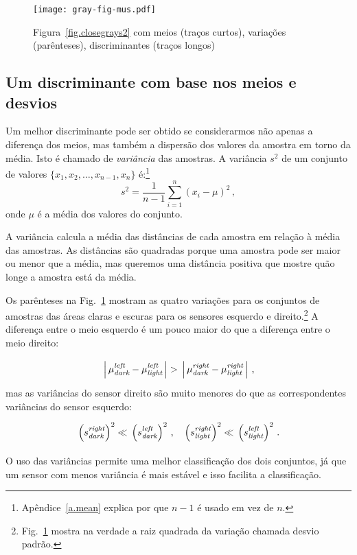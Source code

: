 \begin{figure}
\begin{center}
\texttt{[image: gray-fig-mus.pdf]}
\end{center}
\caption{Figura~\ref{fig.closegrays2} com meios (traços curtos), variações (parênteses), discriminantes (traços longos)}\label{fig.closegraysmus}
\end{figure}

\subsection{Um discriminante com base nos meios e desvios}

Um melhor discriminante pode ser obtido se considerarmos não apenas a diferença dos meios, mas também a dispersão dos valores da amostra em torno da média. Isto é chamado de \emph{variância} das amostras. A variância $s^2$ de um conjunto de valores $\{x_1,x_2,\ldots,x_{n-1},x_n\}$ é:\footnote{Apêndice~\ref{a.mean} explica por que $n-1$ é usado em vez de $n$.}
\[
s^2 = \frac{1}{n-1} \sum_{i=1}^n (x_i-\mu)^2\,,
\]
onde $\mu$ é a média dos valores do conjunto.

A variância calcula a média das distâncias de cada amostra em relação à média das amostras. As distâncias são quadradas porque uma amostra pode ser maior ou menor que a média, mas queremos uma distância positiva que mostre quão longe a amostra está da média.

Os parênteses na Fig.~\ref{fig.closegraysmus} mostram as quatro variações para os conjuntos de amostras das áreas claras e escuras para os sensores esquerdo e direito.\footnote{Fig.~\ref{fig.closegraysmus} mostra na verdade a raiz quadrada da variação chamada desvio padrão.} A diferença entre o meio esquerdo é um pouco maior do que a diferença entre o meio direito:
\[
\rule[-2ex]{0pt}{6ex}\left|\,\mu_{\sub{dark}}^{\sub{left}}-\mu_{\sub{light}}^{\sub{left}}\,\right| > \rule[-2ex]{0pt}{6ex}\left|\,\mu_{\sub{dark}}^{\sub{right}}-\mu_{\sub{light}}^{\sub{right}}\,\right|\,,
\]
mas as variâncias do sensor direito são muito menores do que as correspondentes variâncias do sensor esquerdo:
\[
\rule[-2ex]{0pt}{6ex}\left(s_{\sub{dark}}^{\sub{right}}\right)^2
\ll
\rule[-3ex]{0pt}{6ex}\left(s_{\sub{dark}}^{\sub{left}}\right)^2\,,\;\;\;
\rule[-2ex]{0pt}{6ex}\left(s_{\sub{light}}^{\sub{right}}\right)^2
\ll
\rule[-3ex]{0pt}{6ex}\left(s_{\sub{light}}^{\sub{left}}\right)^2\,.
\]
O uso das variâncias permite uma melhor classificação dos dois conjuntos, já que um sensor com menos variância é mais estável e isso facilita a classificação.

